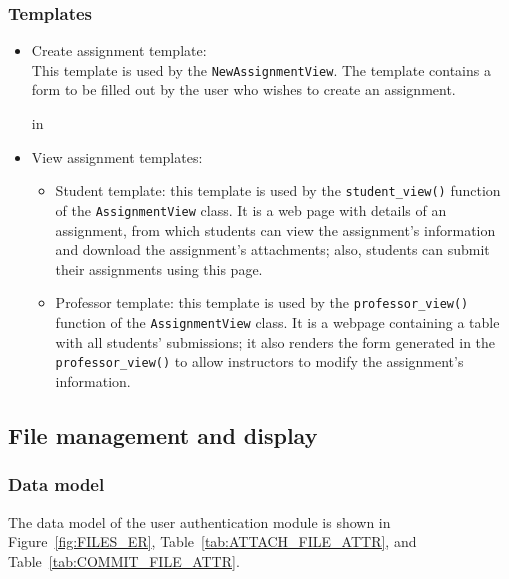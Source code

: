 \subsubsection{Templates}
\begin{itemize}
    \item Create assignment template: \\
    This template is used by the \texttt{NewAssignmentView}.
    The template
    contains a form to be filled out by the user who wishes to create an
    assignment.

     in

    \item View assignment templates:
    \begin{itemize}
        \item Student template: 
            this template is used by the \texttt{student\_view()} function
            of the \texttt{AssignmentView} class. It is
            a web page with details of an assignment, from
            which students can view the assignment's information and
            download the assignment's attachments; also, students can submit
            their assignments using this page.
        \item Professor template:
            this template is used by the \texttt{professor\_view()} function
            of the \texttt{AssignmentView} class. It is a webpage
            containing a table with all students' submissions; it also renders
            the form generated in the \texttt{professor\_\-view()} to allow
            instructors to modify the assignment's information.
    \end{itemize}
\end{itemize}

\FloatBarrier




\subsection{File management and display}

\subsubsection{Data model}
The data model of the user authentication module is shown in
Figure~\ref{fig:FILES_ER}, Table~\ref{tab:ATTACH_FILE_ATTR},
and Table~\ref{tab:COMMIT_FILE_ATTR}. \medskip

